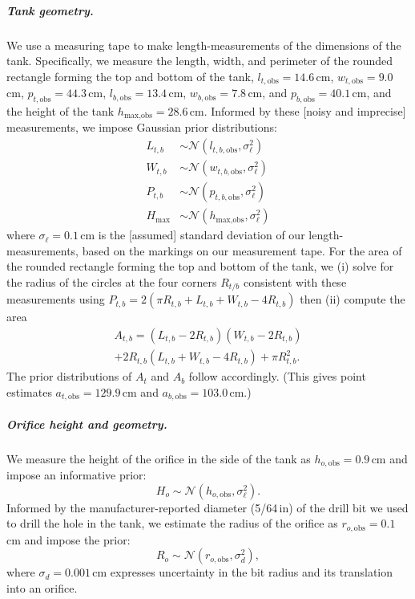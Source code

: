 \documentclass[a4paper,fleqn]{cas-dc}
\begin{document}
\subparagraph{Tank geometry.} We use a measuring tape to make length-measurements of the dimensions of the tank.
Specifically, we measure the length, width, and perimeter of the rounded rectangle forming the top and bottom of the tank,
$l_{t, \text{obs}}=14.6$\,cm, $w_{t, \text{obs}}=9.0$\,cm, $p_{t, \text{obs}}=44.3$\,cm,
$l_{b, \text{obs}}=13.4$\,cm, $w_{b, \text{obs}}=7.8$\,cm, and $p_{b, \text{obs}}=40.1$\,cm, and the height of the tank $h_{\text{max}, \text{obs}}=28.6$\,cm.
Informed by these [noisy and imprecise] measurements, we impose Gaussian prior distributions:
\begin{align}
L_{t,b} &\sim \mathcal{N}(l_{t,b, \text{obs}}, \sigma_\ell^2) \\
W_{t,b} &\sim \mathcal{N}(w_{t,b, \text{obs}}, \sigma_\ell^2) \\
P_{t,b} &\sim \mathcal{N}(p_{t,b, \text{obs}}, \sigma_\ell^2) \\
H_{\text{max}} &\sim \mathcal{N}(h_{\text{max}, \text{obs}}, \sigma_\ell^2)
\end{align}
where $\sigma_\ell=0.1$\,cm is the [assumed] standard deviation of our length-measurements, based on the markings on our measurement tape. 
For the area of the rounded rectangle forming the top and bottom of the tank,
we (i) solve for the radius of the circles at the four corners $R_{t/b}$ consistent with these measurements using $P_{t,b}=2(\pi R_{t,b} + L_{t,b}+W_{t,b}-4R_{t,b})$ then (ii) compute the area \cite{rounded_rect}
\begin{multline}
	A_{t,b}= (L_{t,b}-2R_{t,b})(W_{t,b}-2R_{t,b}) \\ + 2R_{t,b} (L_{t,b}+W_{t,b} -4R_{t,b}) + \pi R_{t,b}^2.
\end{multline}
The prior distributions of $A_t$ and $A_b$ follow accordingly. 
(This gives point estimates $a_{t, \text{obs}}=129.9$\,cm and $a_{b, \text{obs}}=103.0$\,cm.)


\subparagraph{Orifice height and geometry.} 
We measure the height of the orifice in the side of the tank as $h_{o, \text{obs}}=0.9$\,cm and impose an informative prior:
\begin{equation}
H_o \sim \mathcal{N}(h_{o, \text{obs}}, \sigma_\ell^2).
\end{equation}
Informed by the manufacturer-reported diameter (5/64\,in) of the drill bit we used to drill the hole in the tank, we estimate the radius of the orifice as $r_{o, \text{obs}}=0.1$\,cm and impose the prior:
\begin{equation}
R_o \sim \mathcal{N}(r_{o, \text{obs}}, \sigma_d^2), \label{eq:R_o_prior}
\end{equation}
where $\sigma_d= 0.001$\,cm expresses uncertainty in the bit radius and its translation into an orifice.
\end{document}
